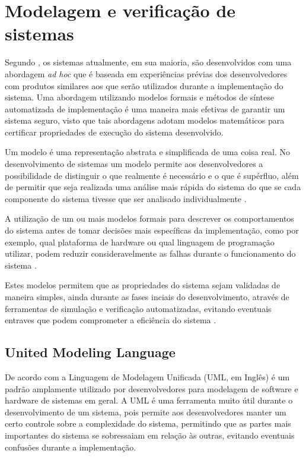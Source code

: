 
\section{Modelagem e verificação de sistemas}

Segundo , os sistemas atualmente, em sua maioria, são desenvolvidos com uma abordagem \textit{ad hoc} que é baseada em experiências prévias dos desenvolvedores com produtos similares aos que serão utilizados durante a implementação do sistema. Uma abordagem utilizando modelos formais e métodos de síntese automatizada de implementação é uma maneira mais efetivas de garantir um sistema seguro, visto que tais abordagens adotam modelos matemáticos para certificar propriedades de execução do sistema desenvolvido. 

Um modelo é uma representação abstrata e simplificada de uma coisa real. No desenvolvimento de sistemas um modelo permite aos desenvolvedores a possibilidade de distinguir o que realmente é necessário e o que é supérfluo, além de permitir que seja realizada uma análise mais rápida do sistema do que se cada componente do sistema tivesse que ser analisado individualmente \cite{UML:2006}.

A utilização de um ou mais modelos formais para descrever os comportamentos do sistema antes de tomar decisões mais específicas da implementação, como por exemplo, qual plataforma de hardware ou qual linguagem de programação utilizar, podem reduzir consideravelmente as falhas durante o funcionamento do sistema \cite{edwards:1997}.

Estes modelos permitem que as propriedades do sistema sejam validadas de maneira simples, ainda durante as fases inciais do desenvolvimento, através de ferramentas de simulação e verificação automatizadas, evitando eventuais entraves que podem comprometer a eficiência do sistema \cite{edwards:1997}.

\subsection{United Modeling Language}

De acordo com  a Linguagem de Modelagem Unificada (UML, em Inglês) é um padrão amplamente utilizado por desenvolvedores para modelagem de software e hardware de sistemas em geral. A UML é uma ferramenta muito útil durante o desenvolvimento de um sistema, pois permite aos desenvolvedores manter um certo controle sobre a complexidade do sistema, permitindo que as partes mais importantes do sistema se sobressaiam em relação às outras, evitando eventuais confusões durante a implementação.

